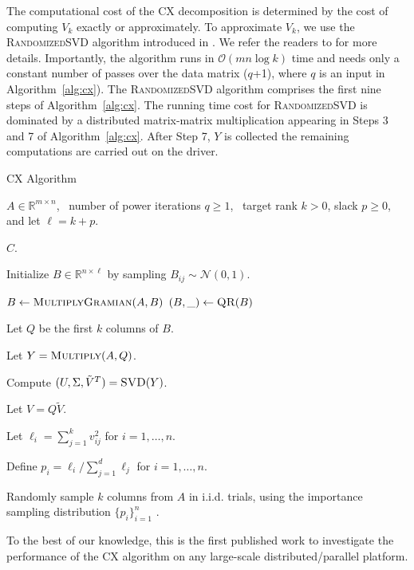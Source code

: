The computational cost of the CX decomposition is determined by the cost of computing $V_k$ exactly or approximately. To approximate $V_k$, we use the \textsc{RandomizedSVD} algorithm introduced in \cite{MRT06,MRT11}. We refer the readers to \cite{HMT09_SIREV,Mah-mat-rev_BOOK} for more details. Importantly, the algorithm runs in $\mathcal{O}(mn \log k)$ time and needs only a constant number of passes over the data matrix ($q$+1), where $q$ is an input in Algorithm~\ref{alg:cx}).  The \textsc{RandomizedSVD} algorithm comprises the first nine steps of Algorithm~\ref{alg:cx}. The running time cost for \textsc{RandomizedSVD} is dominated by a distributed matrix-matrix multiplication appearing in Steps 3 and 7 of Algorithm~\ref{alg:cx}. After Step 7, $Y$ is collected the remaining computations are carried out on the driver.

\begin{algorithm}[tb]
   \caption{{\sc CX} Algorithm}
    \label{alg:cx}
    \begin{algorithmic}[1]
      \Require $A \in \mathbb{R}^{m\times n}$, \
        number of power iterations $q \ge 1$, \
        target rank $k > 0$, slack $p \ge 0$, and let $\ell=k+p$.

      \Ensure $C$.

      \State Initialize $B \in \mathbb{R}^{n\times \ell}$ by sampling $B_{ij} \sim \mathcal{N}(0, 1)$.

      \For{$q$ times}
          \State $B \gets \Call{MultiplyGramian}{A, B}$
          \State $(B, \_) \gets \Call{QR}{B}$
      \EndFor

      \State Let $Q$ be the first $k$ columns of $B$.

      \State Let $Y = \Call{Multiply}{A, Q}$.

      \State Compute $(U, \Sigma, \tilde V^T) = \Call{SVD}{Y}$.

      \State Let $V = Q \tilde V$.

	  \State Let $\ell_i = \sum_{j=1}^k v_{ij}^2$ for $i = 1, \ldots, n$.
      
      \State Define $p_i = \ell_i / \sum_{j=1}^d \ell_j$ for $i=1,\ldots,n$.
      
      \State Randomly sample $k$ columns from $A$ in i.i.d. trials, using the importance sampling distribution $\{p_i\}_{i=1}^n$ .
      \end{algorithmic}
  \end{algorithm}

To the best of our knowledge, this is the first published work to investigate the performance of the CX algorithm on any large-scale distributed/parallel platform.
